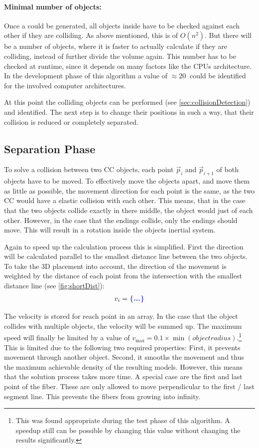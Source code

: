 \paragraph{Minimal number of objects:}
Once a  could be generated, all objects inside have to be checked against each other if they are colliding.
As above mentioned, this is of $O(n^2)$.
But there will be a number of objects, where it is faster to actually calculate if they are colliding, instead of further divide the volume again.
This number has to be checked at runtime, since it depends on many factors like the CPUs architecture.
In the development phase of this algorithm a value of $\approx \SI{20}{}$ could be identified for the involved computer architectures.
\par
%
At this point the colliding objects can be performed (see \cref{sec:collisionDetection}) and identified.
The next step is to change their positions in such a way, that their collision is reduced or completely separated.
%
\subsection{Separation Phase}
To solve a collision between two \ac{CC} objects, each point $\vec{p}_i$ and $\vec{p}_{i+1}$ of both objects have to be moved.
To effectively move the objects apart, and move them as little as possible, the movement direction for each point is the same, as the two \ac{CC} would have a elastic collision with each other.
This means, that in the case that the two objects collide exactly in there middle, the object would just  of each other.
However, in the case that the endings collide, only the endings should move.
This will result in a rotation inside the objects inertial system.
\par
Again to speed up the calculation process this is simplified.
First the direction will be calculated parallel to the smallest distance line between the two objects.
To take the 3D placement into account, the direction of the movement is weighted by the distance of each point from the intersection with the smallest distance line (see \cref{fig:shortDist}):
\begin{align}
v_i = \dummy{}
\end{align}
\par
%
The velocity is stored for reach point in an array.
In the case that the object collides with multiple objects, the velocity will be summed up.
The maximum speed will finally be limited by a value of $v_{\max} = 0.1 \times \min(\mathit{object radius})$.\footnote{This was found appropriate during the test phase of this algorithm. A speedup still can be possible by changing this value without changing the results significantly.}
This is limited due to the following two required properties:
First, it prevents movement through another object.
Second, it smooths the movement and thus the maximum achievable density of the resulting models.
However, this means that the solution process takes more time.
A special case are the first and last point of the fiber.
These are only allowed to move perpendicular to the first / last segment line.
This prevents the fibers from growing into infinity.
%
